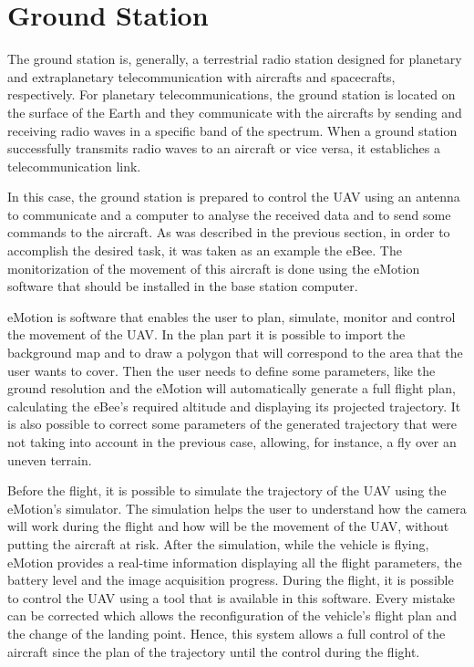 \section{Ground Station}\label{sec:gs}

The ground station is, generally, a terrestrial radio station designed for planetary and extraplanetary telecommunication with aircrafts and spacecrafts, respectively. For planetary telecommunications, the ground station is located on the surface of the Earth and they communicate with the aircrafts by sending and receiving radio waves in a specific band of the spectrum. When a ground station successfully transmits radio waves to an aircraft or vice versa, it establiches a telecommunication link.

In this case, the ground station is prepared to control the UAV using an antenna to communicate and a computer to analyse the received data and to send some commands to the aircraft. As was described in the previous section, in order to accomplish the desired task, it was taken as an example the eBee. The monitorization of the movement of this aircraft is done using the eMotion software that should be installed in the base station computer.

eMotion is software that enables the user to plan, simulate, monitor and control the movement of the UAV. In the plan part it is possible to import the background map and to draw a polygon that will correspond to the area that the user wants to cover. Then the user needs to define some parameters, like the ground resolution and the eMotion will automatically generate a full flight plan, calculating the eBee’s required altitude and displaying its projected trajectory. It is also possible to correct some parameters of the generated trajectory that were not taking into account in the previous case, allowing, for instance, a fly over an uneven terrain.

Before the flight, it is possible to simulate the trajectory of the UAV using the eMotion's simulator. The simulation helps the user to understand how the camera will work during the flight and how will be the movement of the UAV, without putting the aircraft at risk. After the simulation, while the vehicle is flying, eMotion provides a real-time information displaying all the flight parameters, the battery level and the image acquisition progress. During the flight, it is possible to control the UAV using a tool that is available in this software. Every mistake can be corrected which allows the reconfiguration of the vehicle's flight plan and the change of the landing point. Hence, this system allows a full control of the aircraft since the plan of the trajectory until the control during the flight.